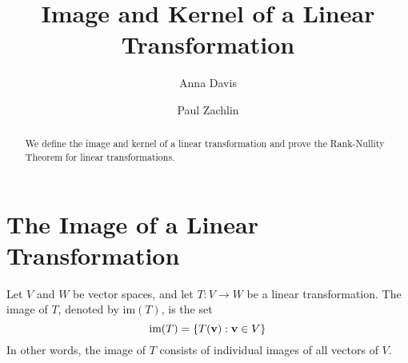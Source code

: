 \documentclass{ximera}
\author{Anna Davis \and Paul Zachlin} \title{Image and Kernel of a Linear Transformation} \license{CC-BY 4.0}
\renewcommand{\vec}[1]{{\bf #1}}
\newcommand{\RR}{\mathbb{R}}
\begin{document}
\begin{abstract}
  We define the image and kernel of a linear transformation and prove the Rank-Nullity Theorem for linear transformations.
\end{abstract}
\maketitle


\section*{The Image of a Linear Transformation}
\begin{definition}\label{def:imageofT}
Let $V$ and $W$ be vector spaces, and let $T:V\rightarrow W$ be a linear transformation.  The image of $T$, denoted by $\text{im}(T)$, is the set
$$\text{im}(T)=\{T(\vec{v}):\vec{v}\in V\}$$
In other words, the image of $T$ consists of individual images of all vectors of $V$.
\end{definition}
\end{document}
